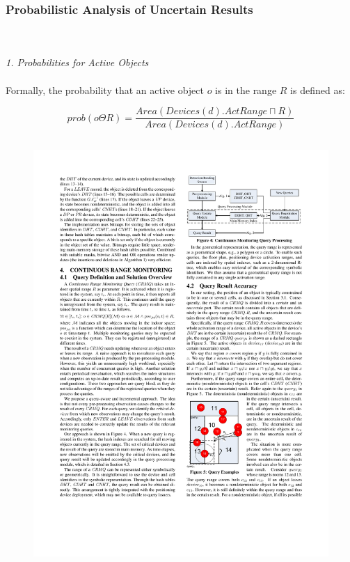 
\begin{frame}
\frametitle{Probabilistic Analysis of Uncertain Results}

\\~\\
\textit{1. Probabilities for Active Objects}
\\~\\
Formally, the probability that an active object $o$ is in the range $R$ is defined as:

\begin{equation}
  prob(o \Theta R) = \frac{Area(Devices(d).ActRange \sqcap R)}{Area(Devices(d).ActRange)}
\end{equation}

\begin{columns}[c]

  \vspace{-15pt}
  \begin{figure}[tb]
    \includegraphics[width=\columnwidth]{figures/2-2/2-2-5.pdf}
  \end{figure}


\end{columns}
\end{frame}
